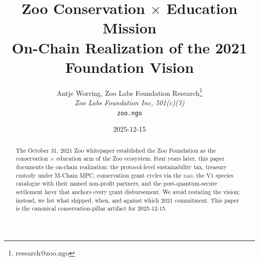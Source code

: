 \documentclass[11pt,letterpaper]{article}
\title{\textbf{Zoo Conservation \texorpdfstring{$\times$}{x} Education Mission}\\[0.3em]
\large On-Chain Realization of the 2021 Foundation Vision}
\author{Antje Worring, Zoo Labs Foundation Research\thanks{research@zoo.ngo}\\
\textit{Zoo Labs Foundation Inc, 501(c)(3)}\\
\texttt{zoo.ngo}}
\date{2025-12-15}
\newcommand{\DAO}{\textsc{dao}}
\begin{document}
\zoocoverpage

\begin{abstract}
\noindent The October 31, 2021 Zoo whitepaper established the Zoo
Foundation as the conservation $\times$ education arm of the Zoo
ecosystem. Four years later, this paper documents the on-chain
realization: the protocol-level sustainability tax, treasury custody
under M-Chain MPC, conservation grant cycles via the \DAO{}, the V1
species catalogue with their named non-profit partners, and the
post-quantum-secure settlement layer that anchors every grant
disbursement. We avoid restating the vision; instead, we list what
shipped, when, and against which 2021 commitment. This paper is the
canonical conservation-pillar artifact for 2025-12-15.
\end{abstract}





\end{document}
